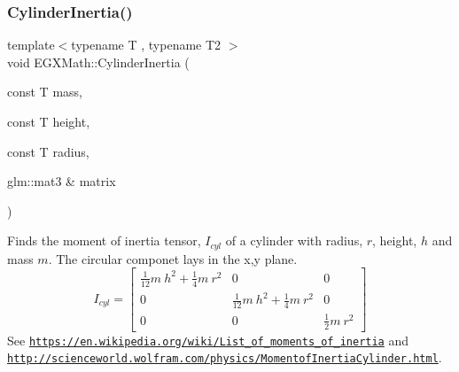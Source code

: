 \subsubsection{\texorpdfstring{Cylinder\+Inertia()}{CylinderInertia()}\hspace{0.1cm}{\footnotesize\ttfamily [3/3]}}
{\footnotesize\ttfamily template$<$typename T , typename T2 $>$ \\
void E\+G\+X\+Math\+::\+Cylinder\+Inertia (\begin{DoxyParamCaption}\item[{const T}]{mass,  }\item[{const T}]{height,  }\item[{const T}]{radius,  }\item[{glm\+::mat3 \&}]{matrix }\end{DoxyParamCaption})}



Finds the moment of inertia tensor, $I_{cyl}$ of a cylinder with radius, $r$, height, $h$ and mass $m$. The circular componet lays in the x,y plane. \[ I_{cyl}=\begin{bmatrix} \frac{1}{12}m\ h^2 + \frac{1}{4}m\ r^2 & 0 & 0\\ 0 & \frac{1}{12}m\ h^2 + \frac{1}{4}m\ r^2 & 0\\ 0 & 0 & \frac{1}{2}m\ r^2 \end{bmatrix} \] See \href{https://en.wikipedia.org/wiki/List_of_moments_of_inertia}{\tt https\+://en.\+wikipedia.\+org/wiki/\+List\+\_\+of\+\_\+moments\+\_\+of\+\_\+inertia} and \href{http://scienceworld.wolfram.com/physics/MomentofInertiaCylinder.html}{\tt http\+://scienceworld.\+wolfram.\+com/physics/\+Momentof\+Inertia\+Cylinder.\+html}. 


